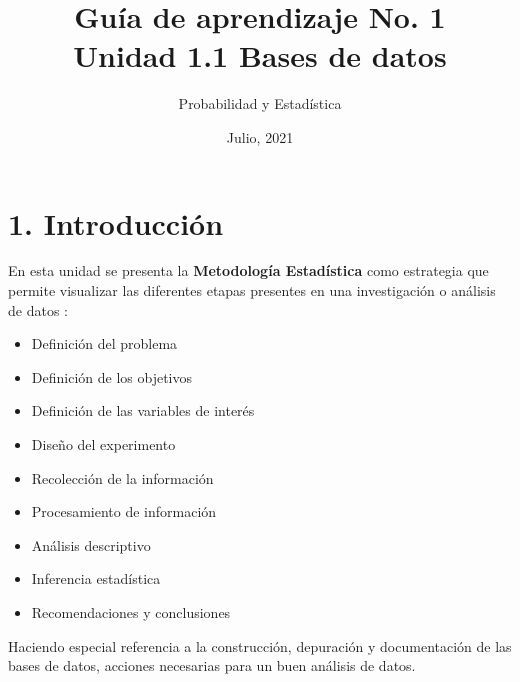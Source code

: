 \documentclass[base=hide,11pt]{elegantbook}
\title{Guía de  aprendizaje No. 1\\
	Unidad  1.1 Bases de datos}
\subtitle{Probabilidad y Estadística}
\institute{Pontificia Universidad Javeriana Cali}
\date{Julio, 2021}
\begin{document}


\maketitle

\frontmatter
%
\mainmatter

\section*{1. Introducción}

En esta unidad se  presenta  la \textbf{Metodología Estadística} como  estrategia que  permite  visualizar las diferentes etapas presentes en una investigación  o análisis de  datos :

\begin{itemize}
	\item Definición del problema
	\item Definición de los objetivos
	\item Definición de las variables de interés
	\item Diseño del experimento
	\item Recolección de la información
	\item Procesamiento de información
	\item Análisis descriptivo
	\item Inferencia estadística
	\item Recomendaciones y conclusiones
\end{itemize}

Haciendo especial referencia a la construcción, depuración  y documentación  de las bases de datos, acciones necesarias para un  buen  análisis de datos.\\
\end{document}
